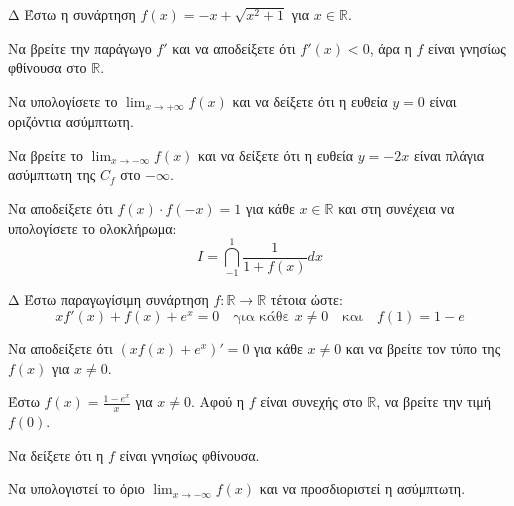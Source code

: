 \begin{thema}{Δ}
Έστω η συνάρτηση $f(x) = -x + \sqrt{x^2+1}$ για $x \in \mathbb{R}$.
\begin{erwthma}
    \item Να βρείτε την παράγωγο $f'$ και να αποδείξετε ότι $f'(x) < 0$, άρα η $f$ είναι γνησίως φθίνουσα στο $\mathbb{R}$.
    \item Να υπολογίσετε το $\lim_{x\to +\infty} f(x)$ και να δείξετε ότι η ευθεία $y=0$ είναι οριζόντια ασύμπτωτη.
    \item Να βρείτε το $\lim_{x\to -\infty} f(x)$ και να δείξετε ότι η ευθεία $y = -2x$ είναι πλάγια ασύμπτωτη της $C_f$ στο $-\infty$.
    \item Να αποδείξετε ότι $f(x) \cdot f(-x) = 1$ για κάθε $x \in \mathbb{R}$ και στη συνέχεια να υπολογίσετε το ολοκλήρωμα:
    \[ I = \dint_{-1}^1 \frac{1}{1+f(x)} dx \]
\end{erwthma}
\end{thema}

\begin{thema}{Δ}
Έστω παραγωγίσιμη συνάρτηση $f: \mathbb{R} \to \mathbb{R}$ τέτοια ώστε:
\[ x f'(x) + f(x) + e^x = 0 \quad \text{για κάθε } x \ne 0 \quad \text{και} \quad f(1) = 1-e \]
\begin{erwthma}
    \item Να αποδείξετε ότι $(x f(x) + e^x)' = 0$ για κάθε $x \neq 0$ και να βρείτε τον τύπο της $f(x)$ για $x \ne 0$.
    \item Έστω $f(x) = \frac{1 - e^x}{x}$ για $x \ne 0$. Αφού η $f$ είναι συνεχής στο $\mathbb{R}$, να βρείτε την τιμή $f(0)$.
    \item Να δείξετε ότι η $f$ είναι γνησίως φθίνουσα.
    \item Να υπολογιστεί το όριο $\displaystyle \lim_{x \to -\infty} f(x)$  και να προσδιοριστεί η ασύμπτωτη.
\end{erwthma}
\end{thema}

